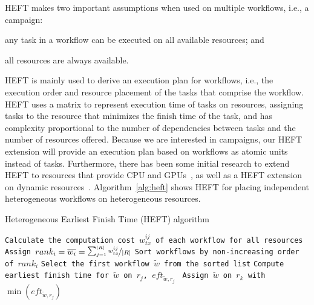 HEFT makes two important assumptions when used on multiple workflows, i.e., a campaign: 
\begin{inparaenum}[(1)] 
    \item any task in a workflow can be executed on all available resources; and 
    \item all resources are always available.
\end{inparaenum}
HEFT is mainly used to derive an execution plan for workflows, i.e., the execution order and resource placement of the tasks that comprise the workflow.
HEFT uses a matrix to represent execution time of tasks on resources, assigning tasks to the resource that minimizes the finish time of the task, and has complexity proportional to the number of dependencies between tasks and the number of resources offered. 
Because we are interested in campaigns, our HEFT extension will provide an execution plan based on workflows as atomic units instead of tasks.
Furthermore, there has been some initial research to extend HEFT to resources that provide CPU and GPUs~\cite{shetti2013optimization}, as well as a HEFT extension on dynamic resources~\cite{dong2007pfas}. 
Algorithm~\ref{alg:heft} shows HEFT for placing independent heterogeneous workflows on heterogeneous resources.

\begin{algorithm}[ht]
    \caption{Heterogeneous Earliest Finish Time (HEFT) algorithm}
    \label{alg:heft}
    \begin{algorithmic}[1]
        \State \texttt{Calculate the computation cost $w_{tx}^{ij}$ of each workflow for all resources}
        \State \texttt{Assign $rank_i = \overline{w_{i}} = \nicefrac{\sum_{j=1}^{|R|}w_{tx}^{ij}}{|R|}$}
        \State \texttt{Sort workflows by non-increasing order of $rank_i$}
        \State \texttt{Select the first workflow $\tilde{w}$ from the sorted list}
        \State\texttt{Compute earliest finish time for $\tilde{w}$ on $r_{j}$, $eft_{\tilde{w},r_j}$ }
        \EndFor
        \State \texttt{Assign  $\tilde{w}$ on $r_k$ with $\min{(eft_{\tilde{w},r_j})}$}
        \EndWhile
        \EndProcedure
    \end{algorithmic}
\end{algorithm}

